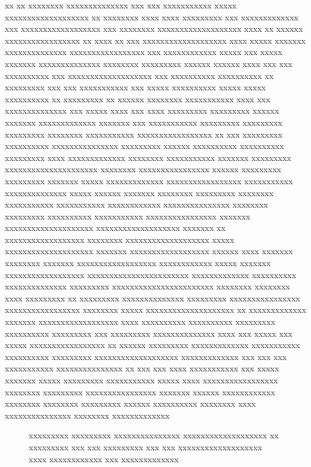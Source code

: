 %
\begin{introduction}
%
xx xx xxxxxxxx xxxxxxxxxxxxxx xxx xxx xxxxxxxxxxx xxxxx xxxxxxxxxxxxxxxxxxx xx xxxxxxxx xxxx xxxx xxxxxxxxx xxx xxxxxxxxxxxxx xxx xxxxxxxxxxxxxxxxxx xxx xxxxxxxx xxxxxxxxxxxxxxxxxxx xxxx xx xxxxxx xxxxxxxxxxxxxxxxx xx xxxx xx xxx xxxxxxxxxxxxxxxxxxx xxxx xxxxx xxxxxxx xxxxxxxxxxxxxx xxxxxxxxxxxxxxxxx xxx xxxxxxxxxxxx xxxxx xxx xxxxx xxxxxxx xxxxxxxxxxxxxx xxxxxxxx xxxxxxxxx xxxxxx xxxxxx xxxx xxx xxx xxxxxxxxxx xxx xxxxxxxxxxxxxxxxxxx xxx xxxxxxxxxx xxxxxxxxxx xx xxxxxxxxx xxx xxx xxxxxxxxxxx xxx xxxxx xxxxxxxxxx xxxxx xxxxx xxxxxxxxxx xx xxxxxxxxx xx xxxxxx xxxxxxxx xxxxxxxxxxx xxxx xxx xxxxxxxxxxxxxx xxx xxxxx xxxx xxx xxxx xxxxxxxxx xxxxxxxxx xxxxxx xxxxxxx xxxxxxxxxxxxx xxxxxxx xxx xxxxxxxxxxx xxxxxxxxx xxxxxxxxx xxxxxxxxx xxxxxxxx xxxxxxxxxxx xxxxxxxxxxxxxxxxx xx xxx xxxxxxxxx xxxxxxxxxx xxxxxxxxxxxxxxx xxxxxxxxx xxxxxx xxxxxxxxxx xxxxxxxxxx xxxxxxxxx xxxx xxxxxxxxxxxxx xxxxxxxx xxxxxxxxxxx xxxxxxx xxxxxxxxx xxxxxxxxxxxxxxxxxxxxx xxxxxxxx xxxxxxxxxxxxxxxx xxxxxx xxxxxxxxx xxxxxxxxx xxxxxxx xxxxx xxxxxxxxxxxxx xxxxxxxxxxxxxxxxx xxxxxxxxxxx xxxxxxxxxxxxxx xxxxx xxxxxx xxxxxxx xxxxxxxx xxxxxxxxx xxxxxxxx xxxxxxxxxxx xxxxxxxxxxx xxxxxxxxxxxx xxxxxxxxxxxxxxx xxxxxxxx xxxxxxxxx xxxxxxxxxx xxxxxxxxxxx xxxxxxxxxxxxxxxx xxxxxxx xxxxxxxxxxxxxxxxxxxx xxxxxxxxxxxxxxxxxxx xxxxxxx xx xxxxxxxxxxxxxxxxxx xxxxxxxx xxxxxxxxxxxxxxxxxxx xxxxx xxxxxxxxxxxxxxxxxxxx xxxxxxx xxxxxxxxxxxxxxxxxx xxxxxx xxxx xxxxxxx xxxxxxxx xxxxxxx xxxxxxxxxxxxxxxxxx xxxxxxxxxxxx xxxxx xxxxxxx xxxxxxxxxxxxxxxxxx xxxxxxxxxxxxxxxxxxxxxxx xxxxxxxxxxxxx xxxxxxxxxx xxxxxxxxxxxxxx xxxxxxxxx xxxxxxxxxxxxxxxxxxxxxxx xxxxxxxx xxxxxxxx xxxx xxxxxxxxx xx xxxxxxxxx xxxxxxxxxxxxxx xxxxxxxxx xxxxxxxxxxxxxxxx xxxxxxxxxxxxxxxxx xxxxxxxx xxxxx xxxxxxxxxxxxxxxxxxxx  xx xxxxxxxxxxxxx xxxxxxx xxxxxxxxxxxxxxxxxx xxxx xxxxxxxxxx xxxxxxxxxx xxxxxxxxx xxxxxxxxxx xxxxxxxxx xxx xxxxxxxxx xxxxxxxxxxxxxx xxxx xxx xxxxx xxx xxxxx xxxxxxxxxxxxxxxxx xx xxxxxx xxxxxxxxx xxxxxxxxxxxxx xxxxxxxxxxx xxxxxxxxxx xxxxxxxxx xxxxxxxxxxxxxxxxxxx xxxxxxxxxxxxx xxx xxx xxx xxxxxxxxxxx xxxxxxxxxxxxxxx xx xxx xxx xxxx xxxxxxxxxxx xxx xxxxx xxxxxxx xxxxx xxxxxxxxx xxxxxxxxxxx xxxxx xxxx xxxxxxxxxxxxxxxxx xxxxxxxx xxxxxxxxx xxxxxxxxxxxxxxxx xxxxxxx xxxxxx xxxxxxxxxxxx xxxxxxxx xxxxxxxx xxxxxxxxx xxxxxx xxxxxxxxxx xxxxxxxx xxxx xxxxxxxxxxxxxxx xxxxxxxx xxxxxxxxxxxxx
\begin{figure}
	\centering
   \caption{xxxxxxxxx xxxxxxxxx xxxxxxxxxxxxxxx xxxxxxxxxxxxxxxxxxx xx xxxxxxxxx xxx xxx xxxxxxxxx xxx xxx xxxxxxxxxxxxxxxxxxx xxxx xxxxxxxxxxxx xxx xxxxxxxxxxxxx}
   \label{xxxx}
\end{figure}


\end{introduction}
